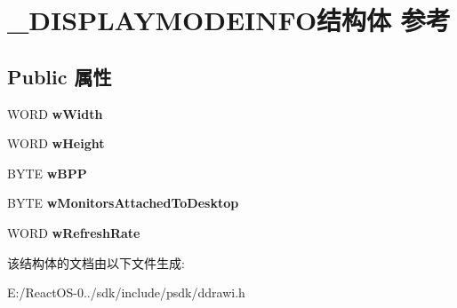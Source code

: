 \hypertarget{struct___d_i_s_p_l_a_y_m_o_d_e_i_n_f_o}{}\section{\+\_\+\+D\+I\+S\+P\+L\+A\+Y\+M\+O\+D\+E\+I\+N\+F\+O结构体 参考}
\label{struct___d_i_s_p_l_a_y_m_o_d_e_i_n_f_o}
\subsection*{Public 属性}
\begin{DoxyCompactItemize}
\item 
\mbox{\label{struct___d_i_s_p_l_a_y_m_o_d_e_i_n_f_o_a6072cc02c6cc4a40d1c014cd2a3c6918}} 
W\+O\+RD {\bfseries w\+Width}
\item 
\mbox{\label{struct___d_i_s_p_l_a_y_m_o_d_e_i_n_f_o_a8b4edf6ba908a191e2ace66f2f3d11fc}} 
W\+O\+RD {\bfseries w\+Height}
\item 
\mbox{\label{struct___d_i_s_p_l_a_y_m_o_d_e_i_n_f_o_a583c44a55805f9d7181bbabc2f33a00b}} 
B\+Y\+TE {\bfseries w\+B\+PP}
\item 
\mbox{\label{struct___d_i_s_p_l_a_y_m_o_d_e_i_n_f_o_aab0eb4437025fa826226c70183983165}} 
B\+Y\+TE {\bfseries w\+Monitors\+Attached\+To\+Desktop}
\item 
\mbox{\label{struct___d_i_s_p_l_a_y_m_o_d_e_i_n_f_o_aaf2210a756ce4e48d2eb8efceddf226a}} 
W\+O\+RD {\bfseries w\+Refresh\+Rate}
\end{DoxyCompactItemize}


该结构体的文档由以下文件生成\+:\begin{DoxyCompactItemize}
\item 
E\+:/\+React\+O\+S-\/0../sdk/include/psdk/ddrawi.\+h\end{DoxyCompactItemize}

